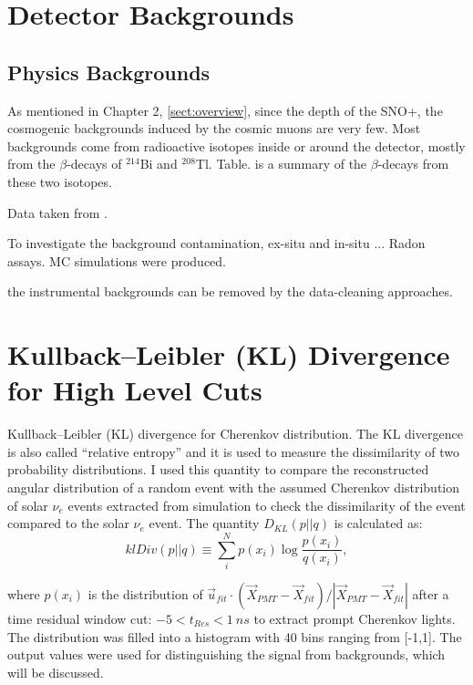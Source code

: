 \section{Detector Backgrounds}

\subsection{Physics Backgrounds}
As mentioned in Chapter 2, \ref{sect:overview}, since the depth of the SNO+, the cosmogenic backgrounds induced by the cosmic muons are very few.  
Most backgrounds come from radioactive isotopes inside or around the detector, mostly from the $\beta$-decays of $^{214}$Bi and $^{208}$Tl. Table. is a summary of the $\beta$-decays from these two isotopes. 

Data taken from \cite{nndc}.

To investigate the background contamination, ex-situ and in-situ ... Radon assays.
MC simulations were produced.


the instrumental backgrounds can be removed by the data-cleaning approaches.



\section{Kullback–Leibler (KL) Divergence for High Level Cuts}

Kullback–Leibler (KL) divergence for Cherenkov distribution. The KL divergence is also called ``relative entropy'' and it is used to measure the dissimilarity of two probability distributions\cite{murphy2012machine}. I used this quantity to compare the reconstructed angular distribution of a random event with the assumed Cherenkov distribution of solar $\nu_e$ events extracted from simulation to check the dissimilarity of the event compared to the solar $\nu_e$ event. The quantity $D_{KL}(p||q)$ is calculated as: 
\begin{equation}\label{kldiv}
klDiv(p||q) \equiv \sum_{i}^N p(x_i)\log{\frac{p(x_i)}{q(x_i)}},
\end{equation}

where $p(x_i)$ is the distribution of $\vec{u}_{fit}\cdot(\vec{X}_{PMT}-\vec{X}_{fit})/|\vec{X}_{PMT}-\vec{X}_{fit}|$ after a time residual window cut: $-5<t_{Res}<1~ns$ to extract prompt Cherenkov lights. The distribution was filled into a histogram with 40 bins ranging from [-1,1]. The output values were used for distinguishing the signal from backgrounds, which will be discussed.


